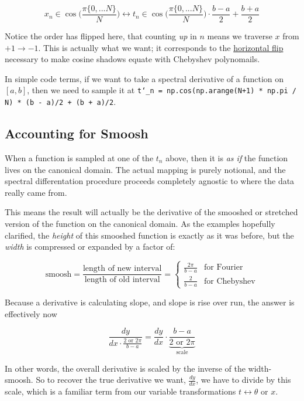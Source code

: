 \documentclass[10pt]{article}
\begin{document}
$$x_n \in \cos\!\Big(\frac{\pi \{0, ... N\}}{N}\Big) \leftrightarrow t_n \in \cos\!\Big(\frac{\pi \{0, ... N\}}{N}\Big) \cdot \frac{b - a}{2} + \frac{b + a}{2} $$

Notice the order has flipped here, that counting \textit{up} in $n$ means we traverse $x$ from $+1 \rightarrow -1$. This is actually what we want; it corresponds to the \hyperref[cylinder]{horizontal flip} necessary to make cosine shadows equate with Chebyshev polynomails.

In simple code terms, if we want to take a spectral derivative of a function on $[a, b]$, then we need to sample it at \texttt{t\char`_n = np.cos(np.arange(N+1) * np.pi / N) * (b - a)/2 + (b + a)/2}.

\subsection{Accounting for Smoosh}

When a function is sampled at one of the $t_n$ above, then it is \textit{as if} the function lives on the canonical domain. The actual mapping is purely notional, and the spectral differentation procedure proceeds completely agnostic to where the data really came from.

This means the result will actually be the derivative of the smooshed or stretched version of the function on the canonical domain. As the examples hopefully clarified, the \textit{height} of this smooshed function is exactly as it was before, but the \textit{width} is compressed or expanded by a factor of:

$$\text{smoosh} = \frac{\text{length of new interval}}{\text{length of old interval}} = \begin{cases} \frac{2\pi}{b-a} & \text{for Fourier} \\ \frac{2}{b-a} & \text{for Chebyshev} \end{cases}$$

Because a derivative is calculating slope, and slope is rise over run, the answer is effectively now

$$\frac{dy}{dx \cdot \frac{2 \text{ or } 2\pi}{b-a}} = \frac{dy}{dx} \cdot \underbrace{\frac{b-a}{2 \text{ or } 2\pi}}_{\text{scale}}$$

In other words, the overall derivative is scaled by the inverse of the width-smoosh. So to recover the true derivative we want, $\frac{dy}{dx}$, we have to divide by this scale, which is a familiar term from our variable transformations $t \leftrightarrow \theta \text{ or } x$.
\end{document}
